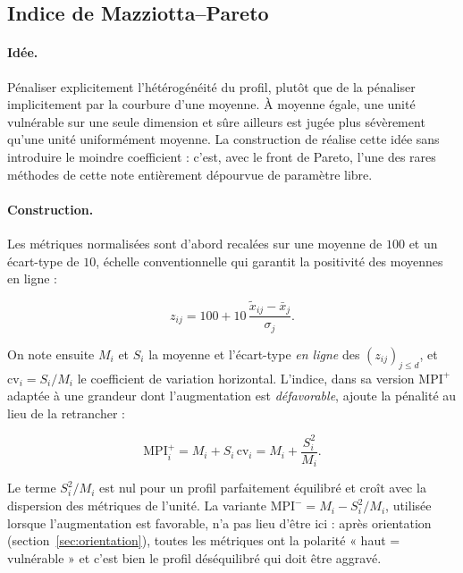 \documentclass[11pt,a4paper]{article}
\theoremstyle{definition}
\theoremstyle{remark}
\begin{document}
\bigskip

\subsection{Indice de Mazziotta--Pareto}
\label{sec:mpi}

\medskip

\paragraph{Idée.} Pénaliser explicitement l'hétérogénéité du profil, plutôt que de la
pénaliser implicitement par la courbure d'une moyenne. À moyenne égale, une unité
vulnérable sur une seule dimension et sûre ailleurs est jugée plus sévèrement qu'une unité
uniformément moyenne. La construction de \citet{mazziotta2016} réalise cette idée sans
introduire le moindre coefficient : c'est, avec le front de Pareto, l'une des rares
méthodes de cette note entièrement dépourvue de paramètre libre.

\medskip

\paragraph{Construction.} Les métriques normalisées sont d'abord recalées sur une moyenne
de $100$ et un écart-type de $10$, échelle conventionnelle qui garantit la positivité des
moyennes en ligne :

\medskip

\[
  z_{ij} = 100 + 10\,\frac{\tilde{x}_{ij} - \bar{x}_j}{\sigma_j} .
\]

\bigskip

On note ensuite $M_i$ et $S_i$ la moyenne et l'écart-type \emph{en ligne} des
$(z_{ij})_{j \le d}$, et $\mathrm{cv}_i = S_i/M_i$ le coefficient de variation horizontal.
L'indice, dans sa version $\mathrm{MPI}^{+}$ adaptée à une grandeur dont l'augmentation est
\emph{défavorable}, ajoute la pénalité au lieu de la retrancher :

\medskip

\[
  \mathrm{MPI}^{+}_i = M_i + S_i\,\mathrm{cv}_i = M_i + \frac{S_i^{2}}{M_i} .
\]

\bigskip

Le terme $S_i^2/M_i$ est nul pour un profil parfaitement équilibré et croît avec la
dispersion des métriques de l'unité. La variante $\mathrm{MPI}^{-} = M_i - S_i^2/M_i$,
utilisée lorsque l'augmentation est favorable, n'a pas lieu d'être ici : après orientation
(section~\ref{sec:orientation}), toutes les métriques ont la polarité « haut = vulnérable »
et c'est bien le profil déséquilibré qui doit être aggravé.
\end{document}
